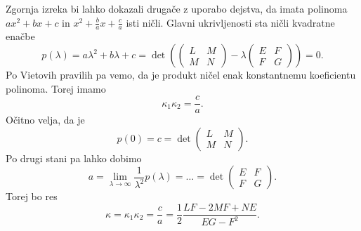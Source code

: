 \begin{opomba}
Zgornja izreka bi lahko dokazali drugače z uporabo dejstva, da imata polinoma $a x^2 + b x + c$ in $x^2 + \frac{b}{a} x + \frac{c}{a}$ isti ničli.
Glavni ukrivljenosti sta ničli kvadratne enačbe \begin{equation*}
 p(\lambda) = a \lambda^2 + b \lambda + c =  \det \left( 
   \begin{pmatrix}
 L & M \\
 M & N
 \end{pmatrix}  - \lambda \begin{pmatrix}
E & F \\
F & G
\end{pmatrix} \right) = 0.
\end{equation*}
Po Vietovih pravilih pa vemo, da je produkt ničel enak konstantnemu koeficientu polinoma. Torej imamo \begin{equation*}
\kappa_1 \kappa_2 = \frac{c}{a}.
\end{equation*}  
Očitno velja, da je $$p(0) = c = \det \begin{pmatrix}
L & M \\
M & N
\end{pmatrix}.$$ Po drugi stani pa lahko dobimo \begin{equation*}
a = \lim_{\lambda \to \infty} \frac{1}{\lambda^2} p(\lambda) = \ldots = \det \begin{pmatrix}
E & F \\
F & G
\end{pmatrix}.
\end{equation*}
Torej bo res \begin{equation*}
\kappa = \kappa_1 \kappa_2 = \frac{c}{a} = \frac{1}{2} \frac{LF - 2MF + NE}{EG - F^2}.
\end{equation*}  
\end{opomba}

